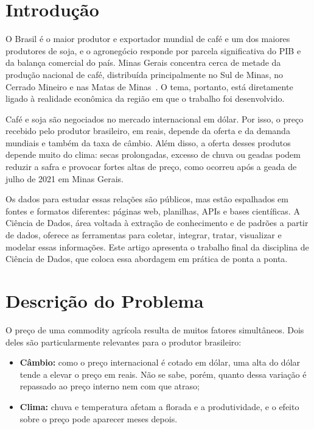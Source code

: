 \documentclass[conference]{IEEEtran}
\begin{document}
\section{Introdução}

O Brasil é o maior produtor e exportador mundial de café e um dos maiores produtores de soja, e o
agronegócio responde por parcela significativa do PIB e da balança comercial do país. Minas Gerais
concentra cerca de metade da produção nacional de café, distribuída principalmente no Sul de Minas,
no Cerrado Mineiro e nas Matas de Minas~\cite{conab}. O tema, portanto, está diretamente ligado à
realidade econômica da região em que o trabalho foi desenvolvido.

Café e soja são negociados no mercado internacional em dólar. Por isso, o preço recebido pelo produtor
brasileiro, em reais, depende da oferta e da demanda mundiais e também da taxa de câmbio. Além disso,
a oferta desses produtos depende muito do clima: secas prolongadas, excesso de chuva ou geadas
podem reduzir a safra e provocar fortes altas de preço, como ocorreu após a geada de julho de 2021 em
Minas Gerais.

Os dados para estudar essas relações são públicos, mas estão espalhados em fontes e formatos
diferentes: páginas web, planilhas, APIs e bases científicas. A Ciência de Dados, área voltada à extração
de conhecimento e de padrões a partir de dados, oferece as ferramentas para coletar, integrar, tratar,
visualizar e modelar essas informações. Este artigo apresenta o trabalho final da disciplina de Ciência de
Dados, que coloca essa abordagem em prática de ponta a ponta.

\section{Descrição do Problema}

O preço de uma commodity agrícola resulta de muitos fatores simultâneos. Dois deles são
particularmente relevantes para o produtor brasileiro:
\begin{itemize}
  \item \textbf{Câmbio:} como o preço internacional é cotado em dólar, uma alta do dólar tende a elevar o
  preço em reais. Não se sabe, porém, quanto dessa variação é repassado ao preço interno nem com que
  atraso;
  \item \textbf{Clima:} chuva e temperatura afetam a florada e a produtividade, e o efeito sobre o preço
  pode aparecer meses depois.
\end{itemize}
\end{document}
